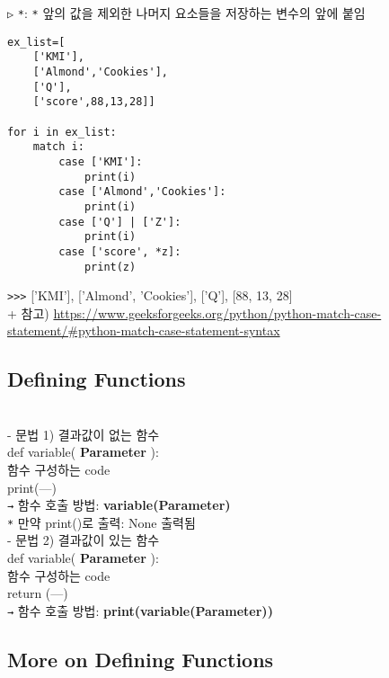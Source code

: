 \documentclass[11pt,a4paper]{article}
\begin{document}
\begin{spacing}{1.5}
\texttt{▷} \texttt{*}: \texttt{*} 앞의 값을 제외한 나머지 요소들을 저장하는 변수의 앞에 붙임
\begin{lstlisting}[label={list:first}]
ex_list=[
    ['KMI'],
    ['Almond','Cookies'],
    ['Q'],
    ['score',88,13,28]]

for i in ex_list:
    match i:
        case ['KMI']:
            print(i)
        case ['Almond','Cookies']:
            print(i)
        case ['Q'] | ['Z']:
            print(i)
        case ['score', *z]:
            print(z)
\end{lstlisting}
\verb|>>>| ['KMI'], ['Almond', 'Cookies'], ['Q'], [88, 13, 28]\\

+ 참고) \url{https://www.geeksforgeeks.org/python/python-match-case-statement/#python-match-case-statement-syntax}\\


\subsection{\Large\textbf{Defining Functions}}\\
- 문법 1) 결과값이 없는 함수\\
def variable( \textbf{Parameter} ):\\
\hspace*{2em}함수 구성하는 code\\
\hspace*{2em}print(---)\\
\texttt{→} 함수 호출 방법: \textbf{variable(Parameter)}\\

\texttt{*} 만약 print()로 출력: None 출력됨\\



- 문법 2) 결과값이 있는 함수\\
def variable( \textbf{Parameter} ):\\
\hspace*{2em}함수 구성하는 code\\
\hspace*{2em}return (---)\\
\texttt{→} 함수 호출 방법: \textbf{print(variable(Parameter))}\\


\subsection{\Large\textbf{More on Defining Functions}}\\

\end{spacing}
\end{document}
